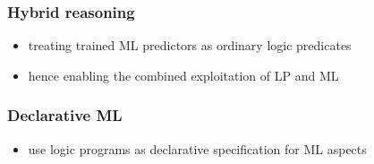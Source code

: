 \documentclass[presentation]{beamer}\mode<presentation>{\usetheme{AMSBolognaFC}}
\begin{document}
\begin{frame}%
    \frametitle{Hybrid reasoning}

    \begin{itemize}
        \item treating trained ML predictors as ordinary logic predicates
        \item hence enabling the combined exploitation of LP and ML
    \end{itemize}


\end{frame}

\begin{frame}%
    \frametitle{Declarative ML}

    \begin{itemize}
        \item use logic programs as declarative specification for ML aspects
    \end{itemize}


\end{frame}
\end{document}
